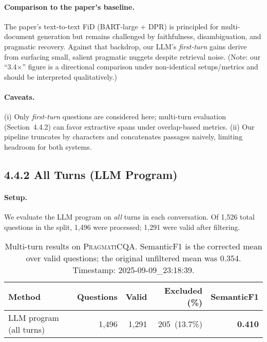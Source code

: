 \documentclass[12pt, letterpaper]{article}
\begin{document}
\paragraph{Comparison to the paper’s baseline.}
The paper’s text-to-text FiD (BART-large + DPR) is principled for multi-document generation but remains challenged by faithfulness, disambiguation, and pragmatic recovery. Against that backdrop, our LLM’s \emph{first-turn} gains derive from surfacing small, salient pragmatic nuggets despite retrieval noise. (Note: our “3.4\(\times\)” figure is a directional comparison under non-identical setups/metrics and should be interpreted qualitatively.)

\paragraph{Caveats.}
(i) Only \emph{first-turn} questions are considered here; multi-turn evaluation (Section~4.4.2) can favor extractive spans under overlap-based metrics. (ii) Our pipeline truncates by characters and concatenates passages naively, limiting headroom for both systems.

{}
\subsection*{4.4.2 All Turns (LLM Program)}

\paragraph{Setup.}
We evaluate the LLM program on \emph{all} turns in each conversation. Of 1{,}526 total questions in the split, 1{,}496 were processed; 1{,}291 were valid after filtering.

\begin{table}[h]
\centering
\small
\begin{tabular}{lrrrr}
\toprule
\textbf{Method} & \textbf{Questions} & \textbf{Valid} & \textbf{Excluded (\%)} & \textbf{SemanticF1} \\
\midrule
LLM program (all turns) & 1{,}496 & 1{,}291 & 205 \,(13.7\%) & \textbf{0.410} \\
\bottomrule
\end{tabular}
\caption{Multi-turn results on \textsc{PragmatiCQA}. SemanticF1 is the corrected mean over valid questions; the original unfiltered mean was 0.354. Timestamp: 2025-09-09\_23:18:39.}
\label{tab:allturns}
\end{table}
\end{document}
